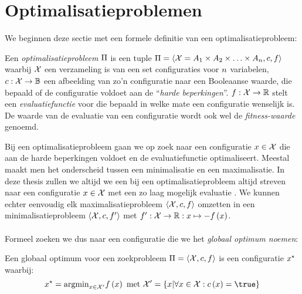 \section{Optimalisatieproblemen}

We beginnen deze sectie met een formele definitie van een optimalisatieprobleem:

\begin{definition}
Een \emph{optimalisatieprobleem} $\Pi$ is een tuple $\Pi=\left\langle \mathcal{X}=A_1\times A_2\times\ldots\times A_{n},c,f\right\rangle$ waarbij $\mathcal{X}$ een verzameling is van een set configuraties voor $n$ variabelen, $c:\mathcal{X}\rightarrow \mathbb{B}$ een afbeelding van zo'n configuratie naar een Booleaanse waarde, die bepaald of de configuratie voldoet aan de ``\emph{harde beperkingen}''. $f:\mathcal{X}\rightarrow \mathbb{R}$ stelt een \emph{evaluatiefunctie} voor die bepaald in welke mate een configuratie wenselijk is. De waarde van de evaluatie van een configuratie  wordt ook wel de \emph{fitness-waarde} genoemd.
\end{definition}
Bij een optimalisatieprobleem gaan we op zoek naar een configuratie $x\in\mathcal{X}$ die aan de harde beperkingen voldoet en de evaluatiefunctie optimaliseert. Meestal maakt men het onderscheid tussen een minimalisatie en een maximalisatie. In deze thesis zullen we altijd we een bij een optimalisatieprobleem altijd streven naar een configuratie $x\in\mathcal{X}$ met een zo laag mogelijk evaluatie . We kunnen echter eenvoudig elk maximalisatieprobleem $\left\langle \mathcal{X},c,f\right\rangle$ omzetten in een minimalisatieprobleem $\left\langle \mathcal{X},c,f'\right\rangle$ met $f':\mathcal{X}\rightarrow \mathbb{R}:x\mapsto -f\left(x\right)$.

\paragraph{}
Formeel zoeken we dus naar een configuratie \xstar{} die we het \emph{globaal optimum noemen}:

\begin{definition}
Een globaal optimum voor een zoekprobleem $\Pi=\left\langle \mathcal{X},c,f\right\rangle$ is een configuratie $x^{\star}$ waarbij:
\begin{equation}
\bestSol=\displaystyle\argmin_{\sol\in\ConfigValSet}\fun{\evalfun}{\sol}\mbox{ met }\ConfigValSet=\accl{\sol|\forall\sol\in\ConfigSet:\fun{\hcfun}{\sol}=\true}
\end{equation}
\end{definition}

